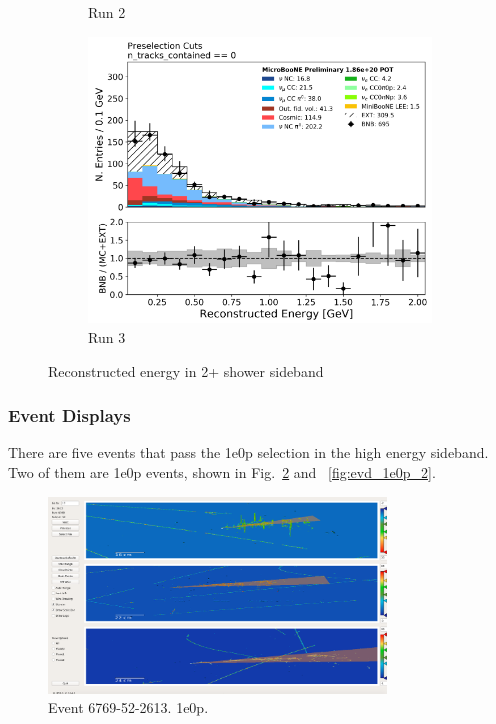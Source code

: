 \begin{figure}[H]
\begin{subfigure}{0.3\textwidth}
    \caption{Run 2}
    \end{subfigure}
    \begin{subfigure}{0.3\textwidth}
    \includegraphics[width=1.0\textwidth]{Sidebands/Figures/twoshr_0p_timedep/run3_recoe.pdf}
    \caption{Run 3}
    \end{subfigure}
    \caption{Reconstructed energy in 2+ shower sideband} 
    \label{fig:2shr0p_rundep}
\end{figure}

\subsubsection{Event Displays}

There are five events that pass the 1e0p selection in the high energy sideband.  Two of them are 1e0p events, shown in Fig.~\ref{fig:evd_1e0p_1} and ~\ref{fig:evd_1e0p_2}.

\begin{figure}[H]
    \centering
    \includegraphics[width=0.8\textwidth]{1e0p/High_E_Sideband/evds/1e0p1_6769_52_2613.pdf}
    \caption{Event 6769-52-2613. 1e0p.}
    \label{fig:evd_1e0p_1}
\end{figure}

